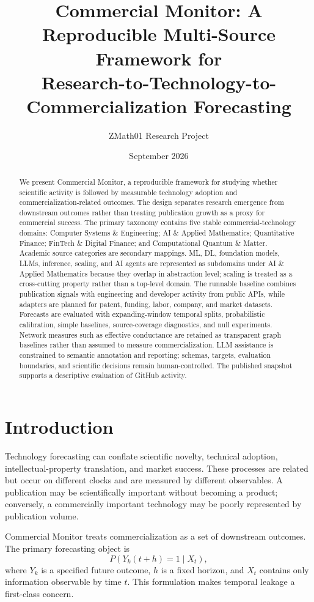 \documentclass[11pt]{article}
\title{Commercial Monitor: A Reproducible Multi-Source Framework for\\Research-to-Technology-to-Commercialization Forecasting}
\author{ZMath01 Research Project}
\date{September 2026}
\begin{document}
\maketitle
\begin{abstract}
We present Commercial Monitor, a reproducible framework for studying whether scientific activity is followed by measurable technology adoption and commercialization-related outcomes. The design separates research emergence from downstream outcomes rather than treating publication growth as a proxy for commercial success. The primary taxonomy contains five stable commercial-technology domains: Computer Systems \& Engineering; AI \& Applied Mathematics; Quantitative Finance; FinTech \& Digital Finance; and Computational Quantum \& Matter. Academic source categories are secondary mappings. ML, DL, foundation models, LLMs, inference, scaling, and AI agents are represented as subdomains under AI \& Applied Mathematics because they overlap in abstraction level; scaling is treated as a cross-cutting property rather than a top-level domain. The runnable baseline combines publication signals with engineering and developer activity from public APIs, while adapters are planned for patent, funding, labor, company, and market datasets. Forecasts are evaluated with expanding-window temporal splits, probabilistic calibration, simple baselines, source-coverage diagnostics, and null experiments. Network measures such as effective conductance are retained as transparent graph baselines rather than assumed to measure commercialization. LLM assistance is constrained to semantic annotation and reporting; schemas, targets, evaluation boundaries, and scientific decisions remain human-controlled. The published snapshot supports a descriptive evaluation of GitHub activity.
\end{abstract}
\section{Introduction}
Technology forecasting can conflate scientific novelty, technical adoption, intellectual-property translation, and market success. These processes are related but occur on different clocks and are measured by different observables. A publication may be scientifically important without becoming a product; conversely, a commercially important technology may be poorly represented by publication volume.

Commercial Monitor treats commercialization as a set of downstream outcomes. The primary forecasting object is
\begin{equation}
P(Y_k(t+h)=1\mid X_t),
\end{equation}
where $Y_k$ is a specified future outcome, $h$ is a fixed horizon, and $X_t$ contains only information observable by time $t$. This formulation makes temporal leakage a first-class concern.
\end{document}
